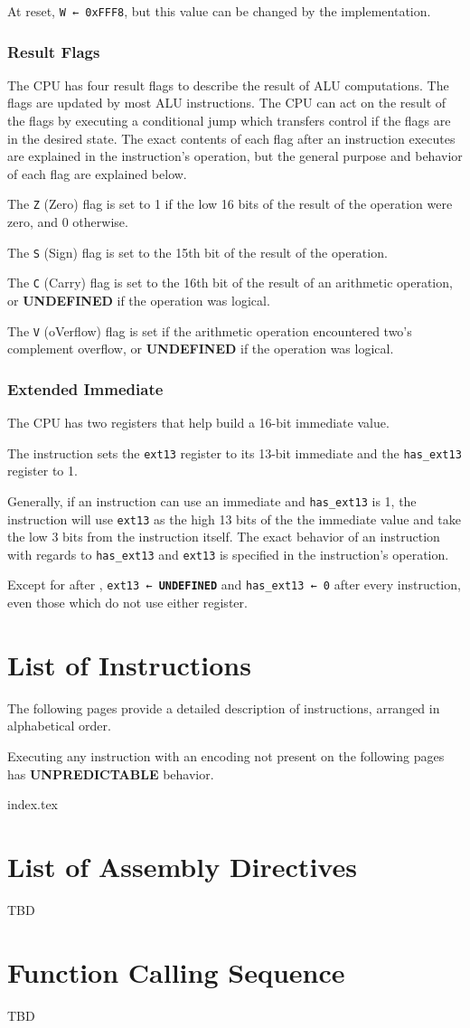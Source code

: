 \documentclass[12pt,a4paper]{article}
\newcommand{\undefined}{\textbf{UNDEFINED}}
\newcommand{\unpredictable}{\textbf{UNPREDICTABLE}}
\begin{document}
At reset, \texttt{W ← 0xFFF8}, but this value can be changed by the implementation.

\subsubsection{Result Flags}
The CPU has four result flags to describe the result of ALU computations. The flags are updated by most ALU instructions. The CPU can act on the result of the flags by executing a conditional jump which transfers control if the flags are in the desired state. The exact contents of each flag after an instruction executes are explained in the instruction's operation, but the general purpose and behavior of each flag are explained below.

The \texttt{Z} (Zero) flag is set to 1 if the low 16 bits of the result of the operation were zero, and 0 otherwise.

The \texttt{S} (Sign) flag is set to the 15th bit of the result of the operation.

The \texttt{C} (Carry) flag is set to the 16th bit of the result of an arithmetic operation, or \undefined{} if the operation was logical.

The \texttt{V} (oVerflow) flag is set if the arithmetic operation encountered two's complement overflow, or \undefined{} if the operation was logical.

\subsubsection{Extended Immediate}
The CPU has two registers that help build a 16-bit immediate value.

The  instruction sets the \texttt{ext13} register to its 13-bit immediate and the \texttt{has\_ext13} register to 1.

Generally, if an instruction can use an immediate and \texttt{has\_ext13} is 1, the instruction will use \texttt{ext13} as the high 13 bits of the the immediate value and take the low 3 bits from the instruction itself. The exact behavior of an instruction with regards to \texttt{has\_ext13} and \texttt{ext13} is specified in the instruction's operation.

Except for after , \texttt{ext13 ← \undefined{}} and \texttt{has\_ext13 ← 0} after every instruction, even those which do not use either register.

\pagebreak

\section{List of Instructions}
The following pages provide a detailed description of instructions, arranged in alphabetical order.

Executing any instruction with an encoding not present on the following pages has \unpredictable{} behavior.
\pagebreak

{index.tex}

\section{List of Assembly Directives}
TBD
\pagebreak

\section{Function Calling Sequence}
TBD
\pagebreak
\end{document}
